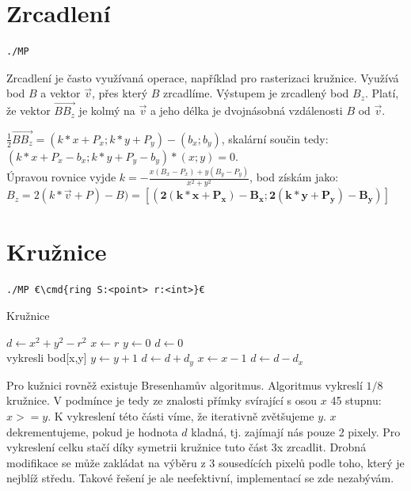 \documentclass[a4paper,12pt]{report}
\newcommand{\cmd}[1]{\textcolor{blue}{\textbf{#1}}}
\begin{document}
\section{Zrcadlení}
\begin{lstlisting}
./MP
\end{lstlisting}

Zrcadlení je často využívaná operace, například pro rasterizaci kružnice.
Využívá bod $B$ a vektor $\vec{v}$, přes který $B$ zrcadlíme. Výstupem je zrcadlený bod $B_{z}$.
Platí, že vektor $\overrightarrow{BB_{z}}$ je kolmý na $\vec{v}$ a jeho délka je dvojnásobná vzdálenosti $B$ od $\vec{v}$.


$\frac{1}{2} \overrightarrow{BB_{z}} = (k*x+P_x;k*y+P_y)-(b_x;b_y)$, skalární součin tedy:
\\$(k*x+P_x-b_x;k*y+P_y-b_y)*(x;y)=0$.
\\Úpravou rovnice vyjde $k = -\frac{x(B_x-P_x)+y(B_y-P_y)}{x^2+y^2}$, bod získám jako:
$B_z = 2(k*\vec{v}+P)-B) = [\bm{(2(k*x+P_x)-B_x;2(k*y+P_y)-B_y)}]$




\section{Kružnice} %
\begin{lstlisting}
./MP €\cmd{ring S:<point> r:<int>}€
\end{lstlisting}

\begin{multicols}{2}
\begin{algorithm}[H]
\caption{Kružnice}
\begin{algorithmic}
\State $d \gets x^2 + y^2 - r^2$
\State $x \gets r$
\State $y \gets 0$
\State $d \gets 0$
\\vykresli bod[x,y]
\State $y \gets y + 1$
\State $d \gets d + d_y$
    \State $x \gets x - 1$
    \State $d \gets d - d_x$
\EndIf 
\EndWhile
\end{algorithmic}
\end{algorithm}

Pro kužnici rovněž existuje Bresenhamův algoritmus. Algoritmus vykreslí $1/8$ kružnice. V podmínce je tedy ze znalosti přímky svírající s osou $x$ 45 stupnu: $x>=y$. K vykreslení této části víme, že iterativně zvětšujeme $y$. $x$ dekrementujeme, pokud je hodnota $d$ kladná, tj. zajímají nás pouze 2 pixely. Pro vykreslení celku stačí díky symetrii kružnice tuto část 3x zrcadlit. Drobná modifikace se může zakládat na výběru z 3 sousedících pixelů podle toho, který je nejblíž středu. Takové řešení je ale neefektivní, implementací se zde nezabývám.

\end{multicols}
\end{document}
